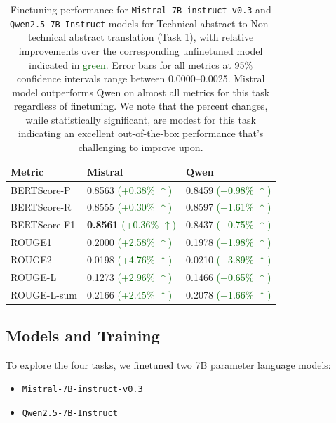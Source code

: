 \documentclass[11pt]{article}
\begin{document}
\begin{table}[t]
\centering
\small
\begin{tabular}{lll}
\toprule
Metric & Mistral & Qwen\\
\midrule
BERTScore-P & 0.8563 \textcolor{darkgreen}{(+0.38\% $\uparrow$)} & 0.8459 \textcolor{darkgreen}{(+0.98\% $\uparrow$)} \\
BERTScore-R    & 0.8555 \textcolor{darkgreen}{(+0.30\% $\uparrow$)} & 0.8597 \textcolor{darkgreen}{(+1.61\% $\uparrow$)} \\
BERTScore-F1        & \textbf{0.8561} \textcolor{darkgreen}{(+0.36\% $\uparrow$)} & 0.8437 \textcolor{darkgreen}{(+0.75\% $\uparrow$)} \\
ROUGE1              & 0.2000 \textcolor{darkgreen}{(+2.58\% $\uparrow$)} & 0.1978 \textcolor{darkgreen}{(+1.98\% $\uparrow$)} \\
ROUGE2              & 0.0198 \textcolor{darkgreen}{(+4.76\% $\uparrow$)} & 0.0210 \textcolor{darkgreen}{(+3.89\% $\uparrow$)} \\
ROUGE-L             & 0.1273 \textcolor{darkgreen}{(+2.96\% $\uparrow$)} & 0.1466 \textcolor{darkgreen}{(+0.65\% $\uparrow$)} \\
ROUGE-L-sum         & 0.2166 \textcolor{darkgreen}{(+2.45\% $\uparrow$)} & 0.2078 \textcolor{darkgreen}{(+1.66\% $\uparrow$)} \\
\bottomrule
\end{tabular}
\caption{Finetuning performance for \texttt{Mistral-7B-instruct-v0.3}
 and \texttt{Qwen2.5-7B-Instruct}
 models for Technical abstract to Non-technical abstract translation (Task 1), with relative improvements over the corresponding unfinetuned model indicated in \textcolor{darkgreen}{green}. Error bars for all metrics at 95\% confidence intervals range between 0.0000--0.0025. Mistral model outperforms Qwen on almost all metrics for this task regardless of finetuning. We note that the percent changes, while statistically significant, are modest for this task indicating an excellent out-of-the-box performance that's challenging to improve upon.}
\label{tab:eval_tech2nontech}
\end{table}

\subsection{Models and Training}

To explore the four tasks, we finetuned two 7B parameter language models:
\begin{itemize}[noitemsep,topsep=0pt]
\item \texttt{Mistral-7B-instruct-v0.3}~\cite{jiang2023mistral7b}
\item \texttt{Qwen2.5-7B-Instruct}~\cite{qwen2}
\end{itemize}
\end{document}
